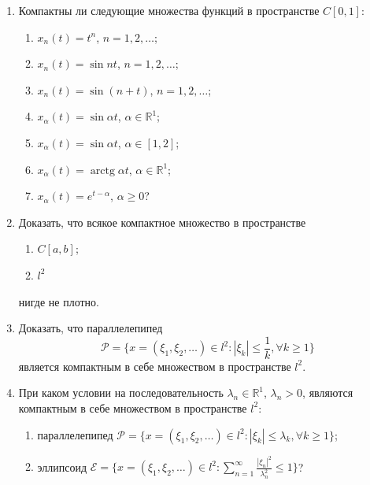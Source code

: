 \documentclass[12pt,a4paper]{article}
\begin{document}
\begin{enumerate}
\item Компактны ли следующие множества функций в пространстве $C[0,1]$:
\begin{enumerate}[label=\alph*)]
\item $x_{n}(t) = t^{n}$, $n=1,2,\dots$;
\item $x_{n}(t) = \sin nt$, $n=1,2,\dots$;
\item $x_{n}(t) = \sin(n+t)$, $n=1,2,\dots$;
\item $x_{\alpha}(t) = \sin \alpha t$, $\alpha \in \mathbb{R}^{1}$;
\item $x_{\alpha}(t) = \sin \alpha t$, $\alpha \in [1,2]$;
\item $x_{\alpha}(t) = \operatorname{arctg} \alpha t$, $\alpha \in \mathbb{R}^{1}$;
\item $x_{\alpha}(t) = e^{t-\alpha}$, $\alpha \ge 0$?
\end{enumerate}

\item Доказать, что всякое компактное множество в пространстве
\begin{enumerate}[label=\alph*)]
\item $C[a,b]$;
\item $l^{2}$
\end{enumerate}
нигде не плотно.

\item Доказать, что параллелепипед
$$ \mathcal{P} = \{x = (\xi_{1}, \xi_{2}, \dots) \in l^{2} : |\xi_{k}| \le \frac{1}{k}, \forall k \ge 1\} $$
является компактным в себе множеством в пространстве $l^{2}$.

\item При каком условии на последовательность $\lambda_{n} \in \mathbb{R}^{1}$, $\lambda_{n} > 0$, являются компактным в себе множеством в пространстве $l^{2}$:
\begin{enumerate}[label=\alph*)]
\item параллелепипед $\mathcal{P} = \{x = (\xi_{1}, \xi_{2}, \dots) \in l^{2} : |\xi_{k}| \le \lambda_{k}, \forall k \ge 1\}$;
\item эллипсоид $\mathcal{E} = \{x = (\xi_{1}, \xi_{2}, \dots) \in l^{2} : \sum_{n=1}^{\infty} \frac{|\xi_{n}|^{2}}{\lambda_{n}^{2}} \le 1\}$?
\end{enumerate}


\end{enumerate}
\end{document}
